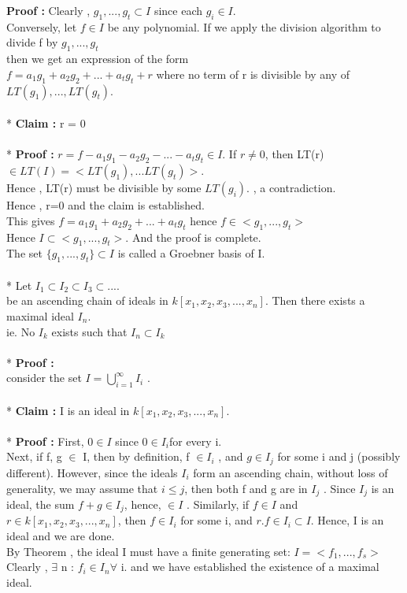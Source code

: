 \documentclass[12pt]{article}
\begin{document}
{\bf Proof :} Clearly , $g_{1},...,g_{t} \subset I$ since each $g_{i} \in I$.\\
Conversely, let $f \in I$ be any polynomial. If we apply the division algorithm to divide f by $g_{1},...,g_{t}$\\
then we get an expression of the form\\
$f = a_{1}g_{1} +a_{2}g_{2}+ ... + a_{t}g_{t} + r$ where no term of r is divisible by any of $LT(g_{1} ), . . . , LT(g_{t} )$.\\\\*
{\bf Claim :} r = 0\\\\*
{\bf Proof :} $r = f - a_{1}g_{1} -a_{2}g_{2}- ... - a_{t}g_{t} \in I$. If $r \neq 0$, then LT(r) $\in LT(I ) = <LT(g_{1} ), . . . LT(g_{t} )>$.\\
Hence , LT(r) must be divisible by some $LT(g_{i} )$. , a contradiction.\\
Hence , r=0 and the claim is established.\\
This gives $f = a_{1}g_{1} +a_{2}g_{2}+ ... + a_{t}g_{t}$  hence $f\in <g_{1} , . . . , g_{t} >$\\
Hence $I \subset <g_{1},...,g_{t}>$. And the proof is complete.\\
The set $\{g_{1} , . . . , g_{t} \} \subset I$ is called a Groebner basis of I.\\\\*
\newpage
{} Let   $I_{1} \subset I_{2} \subset I_{3} \subset ... $.\\ 
be an ascending chain of ideals in $k[x_{1} ,x_{2} ,x_{3},...,x_{n}]$. Then there exists a maximal ideal $I_{n}$.\\
ie. No $I_{k}$ exists such that  $I_{n} \subset I_{k}$\\\\*
{\bf Proof :}\\  
consider the set $I = \bigcup_{i=1}^{\infty} I_{i}$ .\\ \\*
{\bf Claim :} I is an ideal in $k[x_{1} ,x_{2} ,x_{3},...,x_{n}]$.\\\\*
{\bf Proof :} First, $0 \in I$ since $0 \in I_{i}$for every i.\\
Next, if f, g $\in$ I, then by definition, f $\in I_{i}$ , and $g \in I_{j}$ for some i and j (possibly different). However, since the ideals $I_{i}$ form an ascending chain, without loss of generality, we may assume that $i \leq j$, then both f and g are in $I_{j}$ . Since $I_{j}$ is an ideal, the sum $f+g \in I_{j}$, hence, $\in I$ . Similarly, if $f \in I$ and $r \in k[x_{1} ,x_{2} ,x_{3},...,x_{n}]$, then $f \in I_{i}$ for some i, and $r.f \in I_{i} \subset I$. Hence, I is an ideal and we are done.\\
By Theorem , the ideal I must have a finite generating set: $I = <f_{1} , . . . , f_{s}>$\\
Clearly , $\exists$ n : $f_{i} \in I_{n} \forall$ i. and we have established the existence of a maximal ideal.\\
\end{document}
